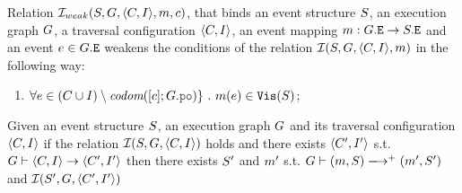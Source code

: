 \documentclass[12pt]{article}
\begin{document}
\begin{definition}
  Relation $\mathcal{I}_{weak}(S, G, \langle C, I \rangle, m, c)$, that binds an 
  event structure $S$, an \imm execution graph $G$,
  a traversal configuration $\langle C, I \rangle$,
  an event mapping $m : G.{\mathtt{E}} \rightarrow S.{\mathtt{E}}$ and an event $e \in G.{\mathtt{E}}$
  weakens the conditions of the relation $\mathcal{I}(S, G, \langle C, I \rangle, m)$
  in the following way:
  \begin{enumerate}[label=\textbf{S.\arabic*}$'$,start=2]
  \item \label{item:simweak-vis}
    $\forall{e \in (\lC \cup \lI) \setminus \codom{[c];\lG.\lPO} \}} ~.~ \lM(e) \in \lVIS(\lES)$;
  \end{enumerate}
\end{definition}

\begin{lemma}
  Given an event structure $S$, an \imm execution graph $G$ 
  and its traversal configuration $\langle C, I \rangle$
  if the relation $\mathcal{I}(S, G, \langle C, I \rangle)$ holds and 
  there exists $\langle C', I' \rangle$ s.t. $G \vdash \langle C, I \rangle \rightarrow \langle C', I' \rangle$
  then there exists $S'$ and $m'$ s.t. $\lG \vdash (\lM, \lES) \ESstep{}^+ (\lM', \lES')$
  and $\mathcal{I}(S', G, \langle C', I' \rangle)$ 
\end{lemma}
\end{document}

